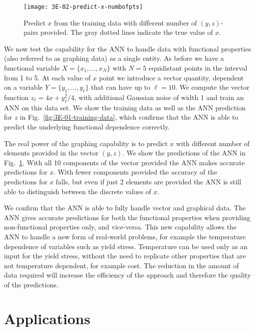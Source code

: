 \documentclass[review]{elsarticle}
\newcommand{\figref}[1]{Fig.~\ref{#1}}
\begin{document}
\begin{figure}
 \centering
 \texttt{[image: 3E-02-predict-x-numbofpts]}
 \caption{Predict $x$ from the training data with different number of $(y,z)$-
   pairs provided. The gray dotted lines indicate the true value of $x$.}
 \label{fig:3E-02-predict-x-numbofpts}
\end{figure}

We now test the capability for the ANN to handle data with functional
properties (also referred to as graphing data) as a single entity. As before
we have a functional variable $X=\{x_1,\ldots,x_N\}$ with $N=5$ equidistant
points in the interval from 1 to 5. At each value of $x$ point we introduce
a vector quantity, dependent on a variable $Y=\{y_{1},\ldots,y_{\ell}\}$
that can have up to $\ell=10$. We compute the vector function
$z_{\ell}=4x+y_{\ell}^2/4$, with additional Gaussian noise of width 1 and
train an ANN on this data set. We show the training data as well as the ANN
prediction for $z$ in \figref{fig:3E-01-training-data}, which confirms that
the ANN is able to predict the underlying functional dependence correctly.

The real power of the graphing capability is to predict $x$ with different
number of elements provided in the vector $(y,z)$. We show the predictions
of the ANN in \figref{fig:3E-02-predict-x-numbofpts}. With all 10 components
of the vector provided the ANN makes accurate predictions for $x$. With
fewer components provided the accuracy of the predictions for $x$ falls, but
even if just 2 elements are provided the ANN is still able to distinguish
between the discrete values of $x$.

We confirm that the ANN is able to fully handle vector and graphical
data. The ANN gives accurate predictions for both the functional properties
when providing non-functional properties only, and vice-versa. This new
capability allows the ANN to handle a new form of real-world problems, for
example the temperature dependence of variables such as yield
stress. Temperature can be used only as an input for the yield stress,
without the need to replicate other properties that are not temperature
dependent, for example cost. The reduction in the amount of data required
will increase the efficiency of the approach and therefore the quality of
the predictions.

\section{Applications}\label{sec:CaseStudies}
\end{document}

